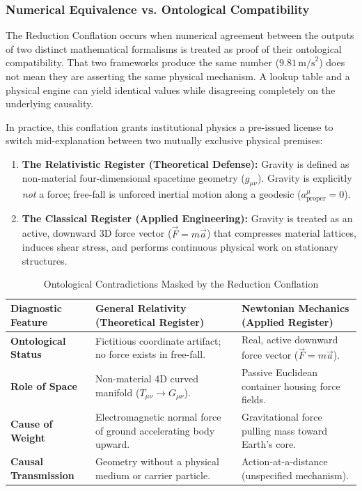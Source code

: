 \documentclass[12pt, a4paper]{article}
\begin{document}
\subsubsection{Numerical Equivalence vs. Ontological Compatibility}

The Reduction Conflation occurs when numerical agreement between the outputs of two distinct mathematical formalisms is treated as proof of their ontological compatibility. That two frameworks produce the same number ($9.81\,\text{m/s}^2$) does not mean they are asserting the same physical mechanism. A lookup table and a physical engine can yield identical values while disagreeing completely on the underlying causality.

In practice, this conflation grants institutional physics a pre-issued license to switch mid-explanation between two mutually exclusive physical premises:

\begin{enumerate}
    \item \textbf{The Relativistic Register (Theoretical Defense):} Gravity is defined as non-material four-dimensional spacetime geometry ($g_{\mu\nu}$). Gravity is explicitly \textit{not} a force; free-fall is unforced inertial motion along a geodesic ($a^\mu_{\text{proper}} = 0$).
    \item \textbf{The Classical Register (Applied Engineering):} Gravity is treated as an active, downward 3D force vector ($\vec{F} = m\vec{a}$) that compresses material lattices, induces shear stress, and performs continuous physical work on stationary structures.
\end{enumerate}

\begin{table}[h!]
\centering
\caption{Ontological Contradictions Masked by the Reduction Conflation}
\label{tab:reduction_conflation_matrix}
\begin{tabular}{p{} p{} p{}}
\toprule
\textbf{Diagnostic Feature} & \textbf{General Relativity (Theoretical Register)} & \textbf{Newtonian Mechanics (Applied Register)} \\
\midrule
\textbf{Ontological Status} & Fictitious coordinate artifact; no force exists in free-fall. & Real, active downward force vector ($\vec{F} = m\vec{a}$). \\
\midrule
\textbf{Role of Space} & Non-material 4D curved manifold ($T_{\mu\nu} \to G_{\mu\nu}$). & Passive Euclidean container housing force fields. \\
\midrule
\textbf{Cause of Weight} & Electromagnetic normal force of ground accelerating body upward. & Gravitational force pulling mass toward Earth's core. \\
\midrule
\textbf{Causal Transmission} & Geometry without a physical medium or carrier particle. & Action-at-a-distance (unspecified mechanism). \\
\bottomrule
\end{tabular}
\end{table}
\end{document}
